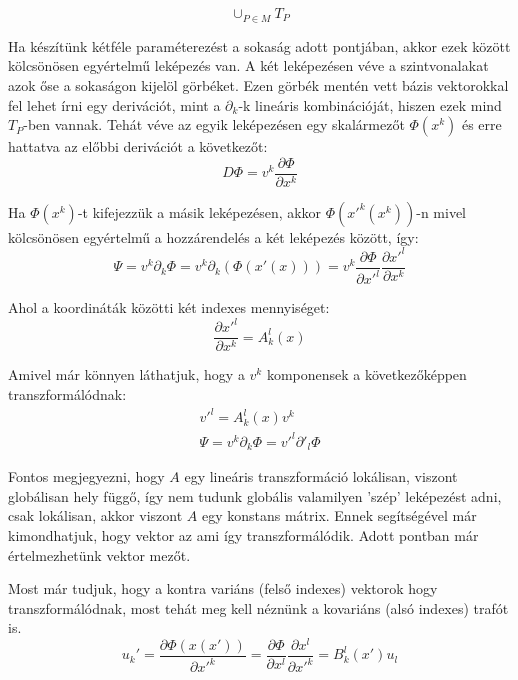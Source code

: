 \documentclass[a4paper,12pt]{article}
\begin{document}
\begin{equation*}
    \cup_{P\in M}^{}T_{P}
\end{equation*}
\par Ha készítünk kétféle paraméterezést a sokaság adott pontjában, akkor ezek között kölcsönösen egyértelmű leképezés van. A két leképezésen véve a szintvonalakat azok őse a sokaságon kijelöl görbéket. Ezen görbék mentén vett bázis vektorokkal fel lehet írni egy derivációt, mint a $\partial_{k}$-k lineáris kombinációját, hiszen ezek mind $T_{P}$-ben vannak. Tehát véve az egyik leképezésen egy skalármezőt $\Phi(x^{k})$ és erre hattatva az előbbi derivációt a következőt:
\begin{equation*}
    D\Phi = v^{k}\frac{\partial\Phi}{\partial x^{k}}
\end{equation*}
\par Ha $\Phi(x^{k})$-t kifejezzük a másik leképezésen, akkor $\Phi(x'^{k}(x^{k}))$-n mivel kölcsönösen egyértelmű a hozzárendelés a két leképezés között, így:
\begin{equation*}
    \Psi = v^{k}\partial_{k}\Phi = v^{k}\partial_{k}(\Phi(x'(x))) = v^{k}\frac{\partial\Phi}{\partial x'^{l}}\frac{\partial x'^{l}}{\partial x^{k}}
\end{equation*}
\par Ahol a koordináták közötti két indexes mennyiséget:
\begin{equation*}
    \frac{\partial x'^{l}}{\partial x^{k}} = A^{l}_{k}(x)
\end{equation*}
\par Amivel már könnyen láthatjuk, hogy a $v^{k}$ komponensek a következőképpen transzformálódnak:
\begin{gather*}
    v'^{l} = A^{l}_{k}(x)v^{k} \\
    \Psi = v^{k}\partial_{k}\Phi = v'^{l}\partial'_{l}\Phi
\end{gather*}
\par Fontos megjegyezni, hogy $A$ egy lineáris transzformáció lokálisan, viszont globálisan hely függő, így nem tudunk globális valamilyen 'szép' leképezést adni, csak lokálisan, akkor viszont $A$ egy konstans mátrix. Ennek segítségével már kimondhatjuk, hogy vektor az ami így transzformálódik. Adott pontban már értelmezhetünk vektor mezőt. 
\par Most már tudjuk, hogy a kontra variáns (felső indexes) vektorok hogy transzformálódnak, most tehát meg kell néznünk a kovariáns (alsó indexes) trafót is.
\begin{equation*}
    u_{k}' = \frac{\partial\Phi(x(x'))}{\partial x'^{k}} = \frac{\partial\Phi}{\partial x^{l}}\frac{\partial x^{l}}{\partial x'^{k}} = B_{k}^{l}(x')u_{l}
\end{equation*}
\end{document}
